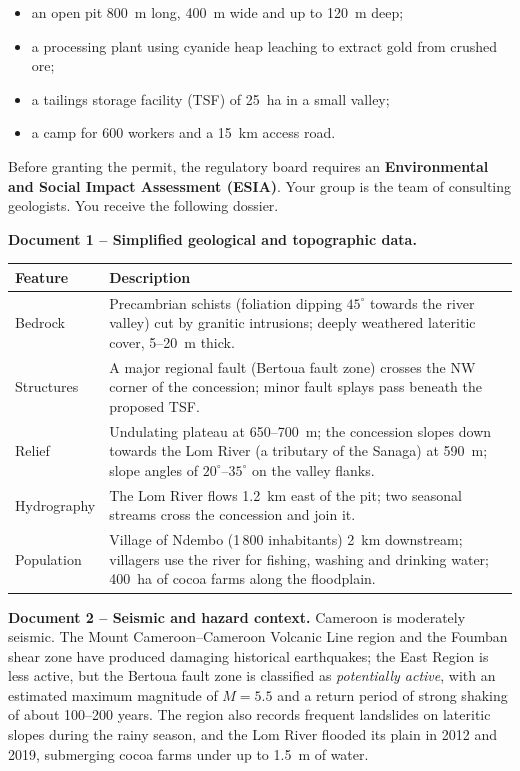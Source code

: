 \documentclass[11pt]{article}
\newcommand{\cle}[1]{{\popxbold\color{popdark}#1}}
\begin{document}
\begin{itemize}
\item an open pit \SI{800}{m} long, \SI{400}{m} wide and up to \SI{120}{m} deep;
\item a processing plant using \cle{cyanide heap leaching} to extract gold from crushed ore;
\item a tailings storage facility (TSF) of \SI{25}{ha} in a small valley;
\item a camp for 600 workers and a \SI{15}{km} access road.
\end{itemize}

Before granting the permit, the regulatory board requires an \textbf{Environmental and Social Impact Assessment (ESIA)}. Your group is the team of consulting geologists. You receive the following dossier.

\textbf{Document 1 -- Simplified geological and topographic data.}

\begin{center}
\begin{tabularx}{\linewidth}{|l|X|}
\hline
\rowcolor{popblueL} \textbf{Feature} & \textbf{Description} \\
\hline
Bedrock & Precambrian schists (foliation dipping $45^{\circ}$ towards the river valley) cut by granitic intrusions; deeply weathered lateritic cover, 5--20~m thick. \\
\hline
Structures & A major regional fault (Bertoua fault zone) crosses the NW corner of the concession; minor fault splays pass beneath the proposed TSF. \\
\hline
Relief & Undulating plateau at 650--700~m; the concession slopes down towards the Lom River (a tributary of the Sanaga) at 590~m; slope angles of $20^{\circ}$--$35^{\circ}$ on the valley flanks. \\
\hline
Hydrography & The Lom River flows 1.2~km east of the pit; two seasonal streams cross the concession and join it. \\
\hline
Population & Village of Ndembo (1\,800 inhabitants) 2~km downstream; villagers use the river for fishing, washing and drinking water; 400~ha of cocoa farms along the floodplain. \\
\hline
\end{tabularx}
\end{center}

\textbf{Document 2 -- Seismic and hazard context.} Cameroon is moderately seismic. The Mount Cameroon--Cameroon Volcanic Line region and the Foumban shear zone have produced damaging historical earthquakes; the East Region is less active, but the Bertoua fault zone is classified as \emph{potentially active}, with an estimated maximum magnitude of $M = 5.5$ and a return period of strong shaking of about 100--200 years. The region also records frequent landslides on lateritic slopes during the rainy season, and the Lom River flooded its plain in 2012 and 2019, submerging cocoa farms under up to 1.5~m of water.
\end{document}
